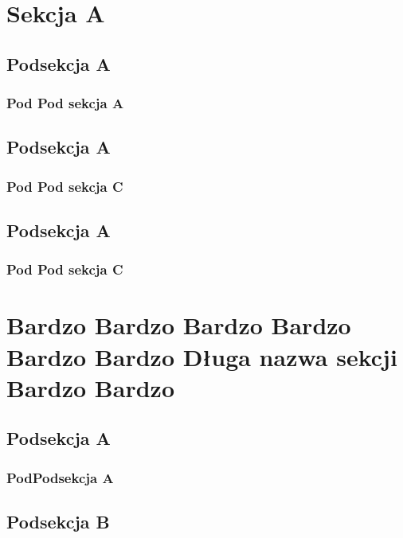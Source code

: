 

\MyTitlePage


\tableofcontents
\newpage

\section{Sekcja A}
\subsection{Podsekcja A}

\subsubsection{Pod Pod sekcja A}
\lipsum[1]
\subsection*{Podsekcja A}
\subsubsection*{Pod Pod sekcja C}
\lipsum[1]
\subsection{Podsekcja A}
\subsubsection*{Pod Pod sekcja C}
\lipsum[1]
\newpage
\section{Bardzo Bardzo Bardzo Bardzo Bardzo Bardzo Długa nazwa sekcji Bardzo Bardzo}
\subsection{Podsekcja A}
\subsubsection{PodPodsekcja A}


\subsection{Podsekcja B}
